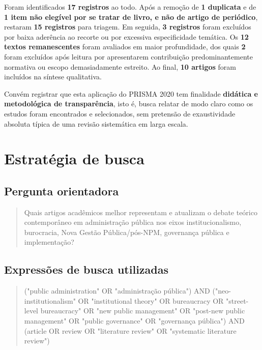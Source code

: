 \documentclass[12pt]{article}
\begin{document}
Foram identificados \textbf{17 registros} ao todo. Após a remoção de \textbf{1 duplicata} e de \textbf{1 item não elegível por se tratar de livro, e não de artigo de periódico}, restaram \textbf{15 registros} para triagem. Em seguida, \textbf{3 registros} foram excluídos por baixa aderência ao recorte ou por excessiva especificidade temática. Os \textbf{12 textos remanescentes} foram avaliados em maior profundidade, dos quais \textbf{2} foram excluídos após leitura por apresentarem contribuição predominantemente normativa ou escopo demasiadamente estreito. Ao final, \textbf{10 artigos} foram incluídos na síntese qualitativa.

Convém registrar que esta aplicação do PRISMA 2020 tem finalidade \textbf{didática e metodológica de transparência}, isto é, busca relatar de modo claro como os estudos foram encontrados e selecionados, sem pretensão de exaustividade absoluta típica de uma revisão sistemática em larga escala.

\section{Estratégia de busca}
\label{sec:org9723b02}

\subsection{Pergunta orientadora}
\label{sec:orga4c6beb}

\begin{quote}
Quais artigos acadêmicos melhor representam e atualizam o debate teórico contemporâneo em administração pública nos eixos institucionalismo, burocracia, Nova Gestão Pública/pós-NPM, governança pública e implementação?
\end{quote}

\subsection{Expressões de busca utilizadas}
\label{sec:orgb585f27}

\begin{quote}
("public administration" OR "administração pública")
AND
("neo-institutionalism" OR "institutional theory" OR bureaucracy OR "street-level bureaucracy" OR "new public management" OR "post-new public management" OR "public governance" OR "governança pública")
AND
(article OR review OR "literature review" OR "systematic literature review")
\end{quote}
\end{document}
